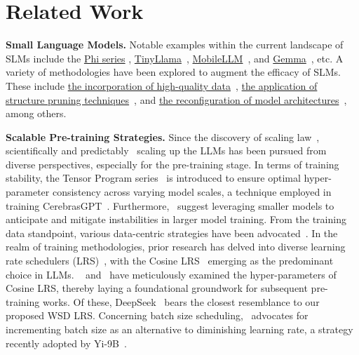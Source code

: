 \vspace{-5mm}
\section{Related Work}
\vspace{-2mm}
\textbf{Small Language Models.} Notable examples within the current landscape of SLMs include the \uline{Phi series} \citep{gunasekar2023textbooks, li2023textbooks, Javaheripi2023Phi2}, \uline{TinyLlama}~\citep{zhang2024tinyllama}, \uline{MobileLLM}~\citep{liu2024mobilellm}, and \uline{Gemma}~\citep{Banks2024Gemma}, etc. 
A variety of methodologies have been explored to augment the efficacy of SLMs. These include \uline{the incorporation of high-quality data}~\citep{gunasekar2023textbooks, li2023textbooks, Javaheripi2023Phi2}, \uline{the application of structure pruning techniques}~\citep{xia2023sheared}, and \uline{the reconfiguration of model architectures}~\citep{liu2024mobilellm}, among others.

\textbf{Scalable Pre-training Strategies.} Since the discovery of scaling law~\citep{kaplan2020scaling, rae2021scaling, aghajanyan2023scaling}, scientifically and predictably~\citep{achiam2023gpt,hu2023unlock, du2024understanding} scaling up the LLMs has been pursued from diverse perspectives, especially for the pre-training stage. In terms of training stability, the Tensor Program series~\citep{yang2022tensor, yang2023tensor} is introduced to ensure optimal hyper-parameter consistency across varying model scales, a technique employed in training CerebrasGPT~\citep{dey2023cerebras}. Furthermore,~\cite{wortsman2023small} suggest leveraging smaller models to anticipate and mitigate instabilities in larger model training. From the training data standpoint, various data-centric strategies have been advocated~\citep{xie2024doremi, shi2023context, ye2024data}. In the realm of training methodologies, prior research has delved into diverse learning rate schedulers (LRS)~\citep{howard2018universal, raffel2020exploring, hundt2019sharpdarts}, with the Cosine LRS~\citep{loshchilov2016sgdr} emerging as the predominant choice in LLMs. ~\cite{kaplan2020scaling} and~\cite{hoffmann2022training} have meticulously examined the hyper-parameters of Cosine LRS, thereby laying a foundational groundwork for subsequent pre-training works. Of these, DeepSeek~\citep{bi2024deepseek} bears the closest resemblance to our proposed WSD LRS. Concerning batch size scheduling,~\cite{smith2017don} advocates for incrementing batch size as an alternative to diminishing learning rate, a strategy recently adopted by Yi-9B~\citep{young2024yi}.